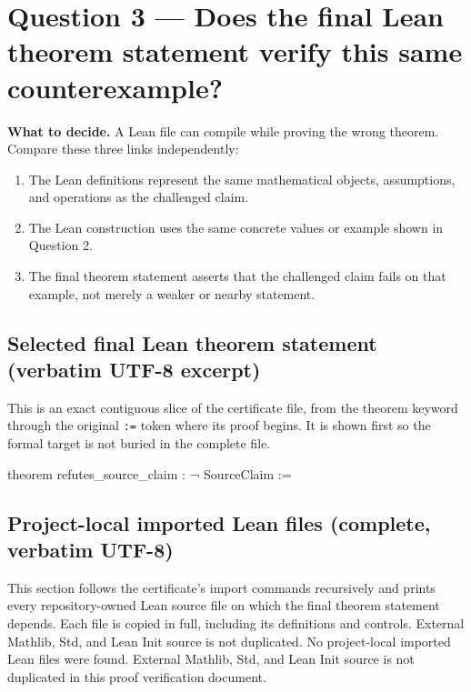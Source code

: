\documentclass[11pt]{article}
\begin{document}
\section*{Question 3 --- Does the final Lean theorem statement verify this same counterexample?}
\textbf{What to decide.} A Lean file can compile while proving the wrong theorem. Compare these three links independently:
\begin{enumerate}
\item The Lean definitions represent the same mathematical objects, assumptions, and operations as the challenged claim.
\item The Lean construction uses the same concrete values or example shown in Question 2.
\item The final theorem statement asserts that the challenged claim fails on that example, not merely a weaker or nearby statement.
\end{enumerate}
\subsection*{Selected final Lean theorem statement (verbatim UTF-8 excerpt)}
This is an exact contiguous slice of the certificate file, from the theorem keyword through the original \texttt{:=} token where its proof begins. It is shown first so the formal target is not buried in the complete file.
\begin{Vlean}
theorem refutes_source_claim : ¬ SourceClaim :=
\end{Vlean}
\subsection*{Project-local imported Lean files (complete, verbatim UTF-8)}
This section follows the certificate's import commands recursively and prints every repository-owned Lean source file on which the final theorem statement depends. Each file is copied in full, including its definitions and controls. External Mathlib, Std, and Lean Init source is not duplicated.
No project-local imported Lean files were found. External Mathlib, Std, and Lean Init source is not duplicated in this proof verification document.
\end{document}
